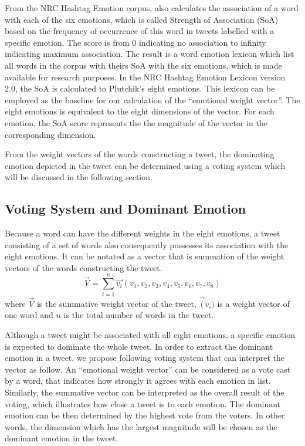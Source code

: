 From the NRC Hashtag Emotion corpus, \citet{mohammad2012emotional} also calculates the association of a word with each of the six emotions, which is called Strength of Association (SoA) based on the frequency of occurrence of this word in tweets labelled with a specific emotion. The score is from 0 indicating no association to infinity indicating maximum association. The result is a word emotion lexicon which list all words in the corpus with theirs SoA with the six emotions, which is made available for research purposes. In the NRC Hashtag Emotion Lexicon version 2.0, the SoA is calculated to Plutchik's eight emotions. This lexicon can be employed as the baseline for our calculation of the ``emotional weight vector''. The eight emotions is equivalent to the eight dimensions of the vector. For each emotion, the SoA score represents the the magnitude of the vector in the corresponding dimension.

From the weight vectors of the words constructing a tweet, the dominating emotion depicted in the tweet can be determined using a voting system which will be discussed in the following section.

\subsection{Voting System and Dominant Emotion}
Because a word can have the different weights in the eight emotions, a tweet consisting of a set of words also consequently possesses its association with the eight emotions. It can be notated as a vector that is summation of the weight vectors of the words constructing the tweet.
\[
	\vec{V} = \sum_{i=1}^{n} \vec{v_i}(v_1, v_2, v_3, v_4, v_5, v_6, v_7, v_8)
\]
where \(\vec{V}\) is the summative weight vector of the tweet, \(\vec(v_i)\) is a weight vector of one word and \(n\) is the total number of words in the tweet.

Although a tweet might be associated with all eight emotions, a specific emotion is expected to dominate the whole tweet. In order to extract the dominant emotion in a tweet, we propose following voting system that can interpret the vector as follow. An ``emotional weight vector'' can be considered as a vote cast by a word, that indicates how strongly it agrees with each emotion in list. Similarly, the summative vector can be interpreted as the overall result of the voting, which illustrates how close a tweet is to each emotion. The dominant emotion can be then determined by the highest vote from the voters. In other words, the dimension which has the largest magnitude will be chosen as the dominant emotion in the tweet.

